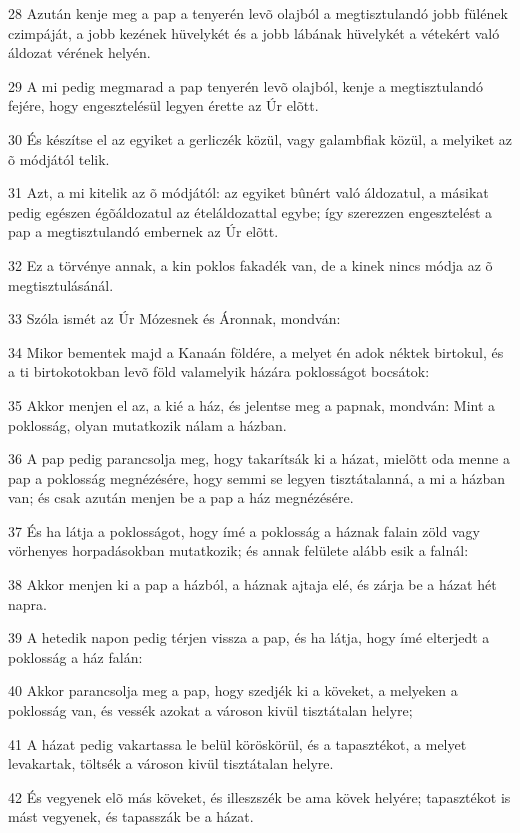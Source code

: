 \par 28 Azután kenje meg a pap a tenyerén levõ olajból a megtisztulandó jobb fülének czimpáját, a jobb kezének hüvelykét és a jobb lábának hüvelykét a vétekért való áldozat vérének helyén.
\par 29 A mi pedig megmarad a pap tenyerén levõ olajból, kenje a megtisztulandó fejére, hogy engesztelésül legyen érette az Úr elõtt.
\par 30 És készítse el az egyiket a gerliczék közül, vagy galambfiak közül, a melyiket az õ módjától telik.
\par 31 Azt, a mi kitelik az õ módjától: az egyiket bûnért való áldozatul, a másikat pedig egészen égõáldozatul az ételáldozattal egybe; így szerezzen engesztelést a pap a megtisztulandó embernek az Úr elõtt.
\par 32 Ez a törvénye annak, a kin poklos fakadék van, de a kinek nincs módja az õ megtisztulásánál.
\par 33 Szóla ismét az Úr Mózesnek és Áronnak, mondván:
\par 34 Mikor bementek majd a Kanaán földére, a melyet én adok néktek birtokul, és a ti birtokotokban levõ föld valamelyik házára poklosságot bocsátok:
\par 35 Akkor menjen el az, a kié a ház, és jelentse meg a papnak, mondván: Mint a poklosság, olyan mutatkozik nálam a házban.
\par 36 A pap pedig parancsolja meg, hogy takarítsák ki a házat, mielõtt oda menne a pap a poklosság megnézésére, hogy semmi se legyen tisztátalanná, a mi a házban van; és csak azután menjen be a pap a ház megnézésére.
\par 37 És ha látja a poklosságot, hogy ímé a poklosság a háznak falain zöld vagy vörhenyes horpadásokban mutatkozik; és annak felülete alább esik a falnál:
\par 38 Akkor menjen ki a pap a házból, a háznak ajtaja elé, és zárja be a házat hét napra.
\par 39 A hetedik napon pedig térjen vissza a pap, és ha látja, hogy ímé elterjedt a poklosság a ház falán:
\par 40 Akkor parancsolja meg a pap, hogy szedjék ki a köveket, a melyeken a poklosság van, és vessék azokat a városon kivül tisztátalan helyre;
\par 41 A házat pedig vakartassa le belül köröskörül, és a tapasztékot, a melyet levakartak, töltsék a városon kivül tisztátalan helyre.
\par 42 És vegyenek elõ más köveket, és illeszszék be ama kövek helyére; tapasztékot is mást vegyenek, és tapasszák be a házat.
